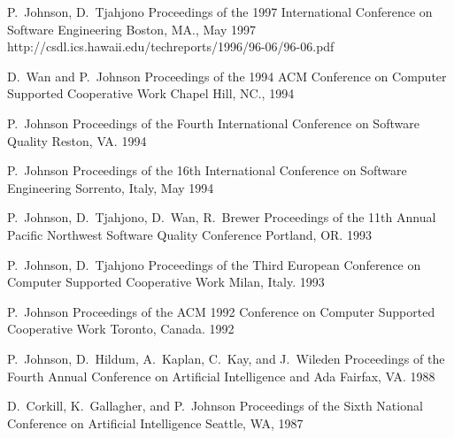 \documentclass[11pt,letterpaper,sans]{moderncv} %
\begin{document}
          {P.~Johnson, D.~Tjahjono}
          {Proceedings of the 1997 International Conference on Software Engineering}
          {Boston, MA., May 1997}
          {http://csdl.ics.hawaii.edu/techreports/1996/96-06/96-06.pdf}

          {D.~Wan and P.~Johnson}
          {Proceedings of the 1994 ACM Conference on Computer Supported Cooperative Work}
          {Chapel Hill, NC., 1994}

          {P.~Johnson}
          {Proceedings of the Fourth International Conference on Software Quality}
          {Reston, VA. 1994}

          {P.~Johnson}
          {Proceedings of the 16th International Conference on Software Engineering}
          {Sorrento, Italy, May 1994}

          {P.~Johnson, D.~Tjahjono, D.~Wan, R.~Brewer}
          {Proceedings of the 11th Annual Pacific Northwest Software Quality Conference}
          {Portland, OR. 1993}

          {P.~Johnson, D.~Tjahjono}
          {Proceedings of the Third European Conference on Computer Supported Cooperative Work}
          {Milan, Italy. 1993}

          {P.~Johnson}
          {Proceedings of the ACM 1992 Conference on Computer Supported Cooperative Work}
          {Toronto, Canada. 1992}

          {P.~Johnson, D.~Hildum, A.~Kaplan, C.~Kay, and J.~Wileden}
          {Proceedings of the Fourth Annual Conference on Artificial Intelligence and Ada}
          {Fairfax, VA. 1988}

          {D.~Corkill, K.~Gallagher, and P.~Johnson}
          {Proceedings of the Sixth National Conference on Artificial Intelligence}
          {Seattle, WA, 1987}
\end{document}
